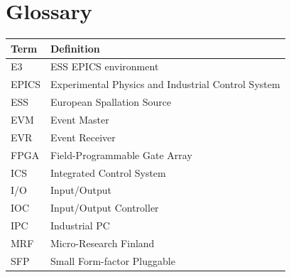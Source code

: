 \documentclass[11pt
  , a4paper
  , article
  , oneside
  , showtrims
]{memoir}
\begin{document}
{\clearpage



\chapter*{Glossary}\label{sec:glossary}
\begin{table}[!htb]
  \begin{tabular}{ll}
    \toprule
    \textbf{Term} & Definition                                          \\\midrule
    E3            & ESS EPICS environment                               \\
    EPICS         & Experimental Physics and Industrial Control System  \\
    ESS           & European Spallation Source                          \\
    EVM           & Event Master                                        \\
    EVR           & Event Receiver                                      \\
    FPGA          & Field-Programmable Gate Array                       \\
    ICS           & Integrated Control System                           \\
    I/O           & Input/Output                                        \\
    IOC           & Input/Output Controller                             \\
    IPC           & Industrial PC                                       \\
    MRF           & Micro-Research Finland                               \\
    SFP           & Small Form-factor Pluggable                         \\
    \bottomrule
  \end{tabular}
  \label{table:glossary}
\end{table}

}
\end{document}

